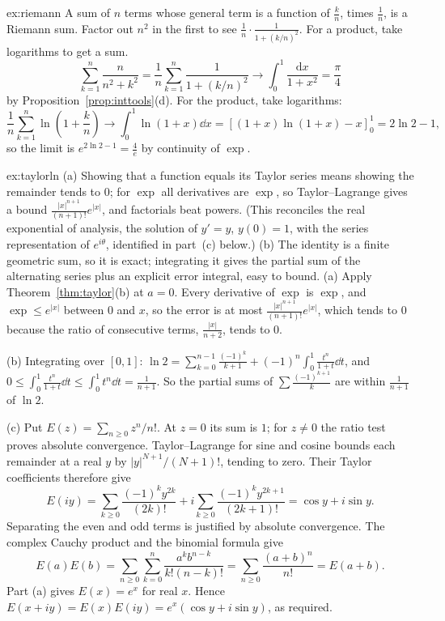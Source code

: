 \begin{solution}{ex:riemann}
\idea A sum of $n$ terms whose general term is a function of $\frac kn$, times $\frac1n$, is a Riemann sum. Factor out $n^2$ in the first to see $\frac1n\cdot\frac1{1+(k/n)^2}$. For a product, take logarithms to get a sum.
\writeup
\[
\sum_{k=1}^n\frac n{n^2+k^2}=\frac1n\sum_{k=1}^n\frac1{1+(k/n)^2}\to\int_0^1\frac{\mathrm dx}{1+x^2}=\frac\pi4
\]
 by Proposition~\ref{prop:inttools}(d).
For the product, take logarithms:
\[
\frac1n\sum_{k=1}^n\ln\left(1+\frac kn\right)\to\int_0^1\ln(1+x)\dd x=\left[(1+x)\ln(1+x)-x\right]_0^1=2\ln2-1,
\]
so the limit is $e^{2\ln2-1}=\frac4e$ by continuity of $\exp$.
\end{solution}

\begin{solution}{ex:taylorln}
\idea (a) Showing that a function equals its Taylor series means showing the remainder tends to $0$; for $\exp$ all derivatives are $\exp$, so Taylor--Lagrange gives a bound $\frac{|x|^{n+1}}{(n+1)!}e^{|x|}$, and factorials beat powers. (This reconciles the real exponential of analysis, the solution of $y'=y$, $y(0)=1$, with the series representation of $e^{i\theta}$, identified in part~(c) below.) (b) The identity is a finite geometric sum, so it is exact; integrating it gives the partial sum of the alternating series plus an explicit error integral, easy to bound.
\writeup (a) Apply Theorem~\ref{thm:taylor}(b) at $a=0$. Every derivative of $\exp$ is $\exp$, and $\exp\le e^{|x|}$ between $0$ and $x$, so the error is at most $\frac{|x|^{n+1}}{(n+1)!}e^{|x|}$, which tends to $0$ because the ratio of consecutive terms, $\frac{|x|}{n+2}$, tends to $0$.

(b) Integrating over $[0,1]$: $\ln2=\sum_{k=0}^{n-1}\frac{(-1)^k}{k+1}+(-1)^n\int_0^1\frac{t^n}{1+t}\dd t$, and
$0\le\int_0^1\frac{t^n}{1+t}\dd t\le\int_0^1t^n\dd t=\frac1{n+1}$. So the partial sums of $\sum\frac{(-1)^{k+1}}k$ are within $\frac1{n+1}$ of $\ln2$.

(c) Put $E(z)=\sum_{n\ge0}z^n/n!$. At $z=0$ its sum is $1$; for $z\ne0$ the ratio test proves absolute convergence.
Taylor--Lagrange for sine and cosine bounds each remainder at a real $y$ by
$|y|^{N+1}/(N+1)!$, tending to zero. Their Taylor coefficients therefore give
\[
E(iy)=\sum_{k\ge0}\frac{(-1)^k y^{2k}}{(2k)!}
+i\sum_{k\ge0}\frac{(-1)^k y^{2k+1}}{(2k+1)!}
=\cos y+i\sin y.
\]
Separating the even and odd terms is justified by absolute convergence.
The complex Cauchy product and the binomial formula give
\[
E(a)E(b)=\sum_{n\ge0}\sum_{k=0}^n
\frac{a^kb^{n-k}}{k!(n-k)!}
=\sum_{n\ge0}\frac{(a+b)^n}{n!}=E(a+b).
\]
Part (a) gives $E(x)=e^x$ for real $x$. Hence
$E(x+iy)=E(x)E(iy)=e^x(\cos y+i\sin y)$, as required.
\end{solution}

